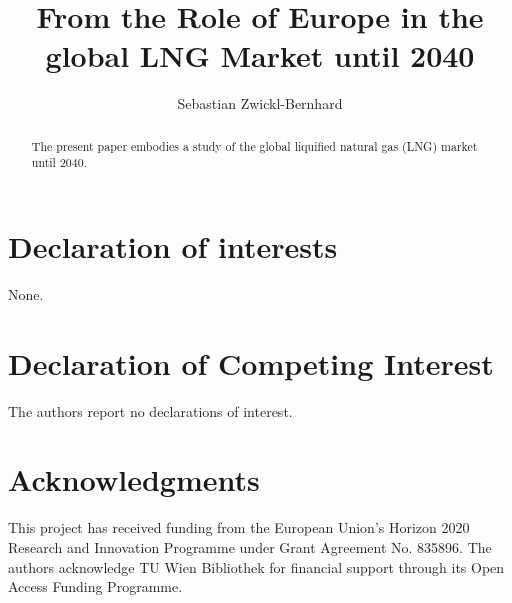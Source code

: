 \documentclass[review]{elsarticle}
\begin{document}
\begin{frontmatter}

\title{From the Role of Europe in the global LNG Market until 2040}
\author[1,2]{Sebastian Zwickl-Bernhard}
\address[1]{Energy Economics Group (EEG), Technische Universität Wien, Gusshausstrasse 25-29/E370-3, 1040 Wien, Austria}
\address[2]{Department of Industrial Economics and Technology Management, \protect\\ The Norwegian University of Science and Technology, Trondheim, Norway}


\begin{abstract}
	The present paper embodies a study of the global liquified natural gas (LNG) market until 2040. 
\end{abstract}

\begin{keyword}	
\end{keyword}
\end{frontmatter}
\newpage

%
%
%
%

\section*{Declaration of interests}
None.
\section*{Declaration of Competing Interest}
The authors report no declarations of interest.
\section*{Acknowledgments}
This project has received funding from the European Union's Horizon 2020 Research and Innovation Programme under Grant Agreement No. 835896. The authors acknowledge TU Wien Bibliothek for financial support through its Open Access Funding Programme.

\appendix
\setcounter{table}{0}
\setcounter{figure}{0}
\end{document}
